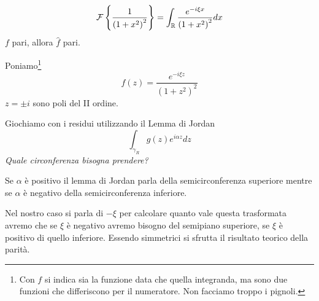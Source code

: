 \Soluzione

\begin{equation*}
\mathcal{F} \left\{\frac{1}{\left(1 + x^{2}\right)^{2}}\right\} = \int_{\mathbb{R}}\frac{e^{- i\xi x}}{\left(1 + x^{2}\right)^{2}} dx
\end{equation*}
$f$ pari, allora $\hat{f}$ pari.

Poniamo\footnote{Con $f$ si indica sia la funzione data che quella integranda, ma sono due funzioni che differiscono per il numeratore. Non facciamo troppo i pignoli.}
\begin{equation*}
f(z) = \frac{e^{- i\xi z}}{\left(1 + z^{2}\right)^{2}}
\end{equation*}
$z = \pm i$ sono poli del II ordine.

Giochiamo con i residui utilizzando il Lemma di Jordan
\begin{equation*}
\int_{\gamma_{R}} g(z) e^{i\alpha z} dz
\end{equation*}
\textit{Quale circonferenza bisogna prendere?}

Se $\alpha $ è positivo il lemma di Jordan parla della semicirconferenza superiore mentre se $\alpha $ è negativo della semicirconferenza inferiore.

Nel nostro caso si parla di $ - \xi $ per calcolare quanto vale questa trasformata avremo che se $\xi $ è negativo avremo bisogno del semipiano superiore, se $\xi $ è positivo di quello inferiore. Essendo simmetrici si sfrutta il risultato teorico della parità.


